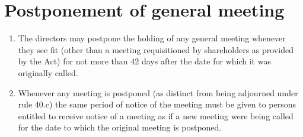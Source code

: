 \section{Postponement of general meeting}

\begin{enumerate}[label=(\alph*)]
    \item The directors may postpone the holding of any general meeting whenever they see fit (other than a meeting requisitioned by shareholders as provided by the Act) for not more than 42 days after the date for which it was originally called.
    
    \item Whenever any meeting is postponed (as distinct from being adjourned under rule 40.c) the same period of notice of the meeting must be given to persons entitled to receive notice of a meeting as if a new meeting were being called for the date to which the original meeting is postponed.
\end{enumerate} 